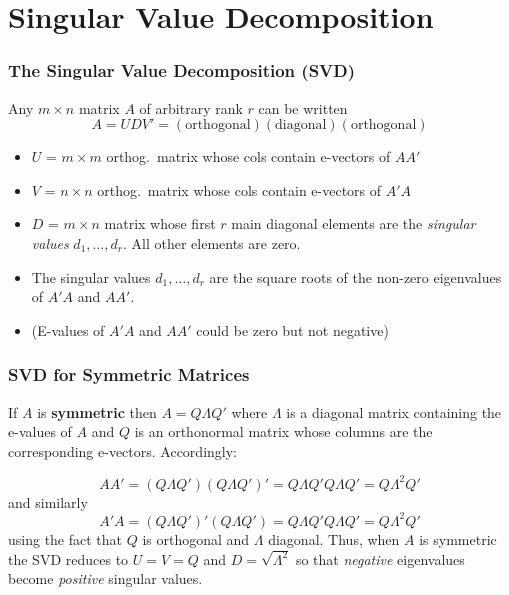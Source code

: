 \section{Singular Value Decomposition}
\begin{frame}
  \frametitle{The Singular Value Decomposition (SVD)}
  
Any $m \times n$ matrix $A$ of arbitrary rank $r$ can be written 
	$$A = UDV' = (\mbox{orthogonal})(\mbox{diagonal})(\mbox{orthogonal})$$
  \vspace{-2em}
	\begin{itemize}
	 	\item $U$ = $m\times m$ orthog.\ matrix whose cols contain e-vectors of $AA'$
	 	\item $V$ = $n\times n$ orthog.\ matrix whose cols contain e-vectors of $A'A$
	 	\item $D$ = $m\times n$ matrix whose first $r$ main diagonal elements are the  \emph{singular values} $d_1, \hdots, d_r$. All other elements are zero.
    \item The singular values $d_1, \hdots, d_r$ are the square roots of the non-zero eigenvalues of $A'A$ \alert{and} $AA'$.
    \item (E-values of $A'A$ and $AA'$ could be zero but not negative)
	 \end{itemize} 
\end{frame}
\begin{frame}
  \frametitle{SVD for Symmetric Matrices}
  
If $A$ is \textbf{symmetric} then $A = Q\Lambda Q'$ where $\Lambda$ is a diagonal matrix containing the e-values of $A$ and $Q$ is an orthonormal matrix whose columns are the corresponding e-vectors. Accordingly:

  \[
    AA' = (Q\Lambda Q')(Q\Lambda Q')' = Q \Lambda Q' Q \Lambda Q' = Q \Lambda^2 Q'
  \]
  and similarly
  \[
    A'A = (Q\Lambda Q')'(Q\Lambda Q') = Q \Lambda Q' Q \Lambda Q' = Q \Lambda^2 Q'
  \]
  using the fact that $Q$ is orthogonal and $\Lambda$ diagonal.
  Thus, when $A$ is symmetric the SVD reduces to $U = V = Q$ and $D = \sqrt{\Lambda^2}$ so that \emph{negative} eigenvalues become \emph{positive} singular values.
\end{frame}


